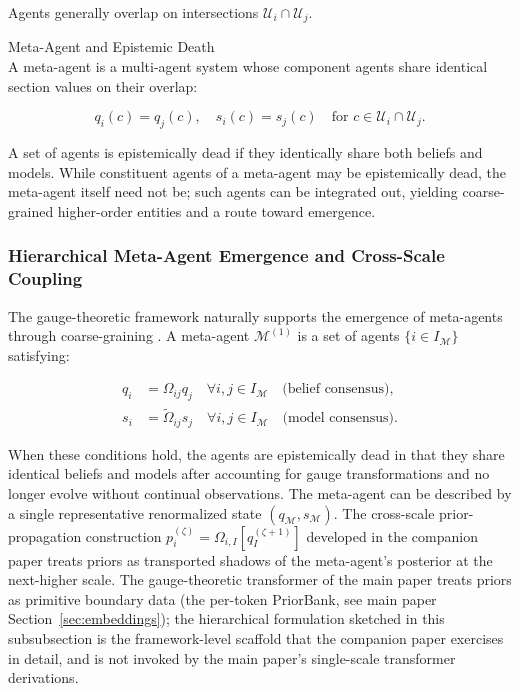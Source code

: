 \documentclass[twoside,11pt]{article}
\begin{document}
Agents generally overlap on intersections $\mathcal{U}_i \cap \mathcal{U}_j$.

Meta-Agent and Epistemic Death\\
A meta-agent is a multi-agent system whose component agents share identical section values on their overlap:

\begin{equation}
q_i(c) = q_j(c), \quad s_i(c) = s_j(c) \quad \text{for } c \in \mathcal{U}_i \cap \mathcal{U}_j.
\end{equation}

A set of agents is epistemically dead if they identically share both beliefs and models. While constituent agents of a meta-agent may be epistemically dead, the meta-agent itself need not be; such agents can be integrated out, yielding coarse-grained higher-order entities and a route toward emergence.

\subsubsection{Hierarchical Meta-Agent Emergence and Cross-Scale Coupling}
\label{sec:appendix_meta_agent}

The gauge-theoretic framework naturally supports the emergence of meta-agents through coarse-graining \citep{kadanoff1966scaling,wilson1974renormalization}. A meta-agent $\mathcal{M}^{(1)}$ is a set of agents $\{i \in I_{\mathcal{M}}\}$ satisfying:

\begin{align}
q_i &= \Omega_{ij} q_j \quad \forall i,j \in I_{\mathcal{M}} \quad \text{(belief consensus)}, \label{eq:belief_consensus} \\
s_i &= \tilde{\Omega}_{ij} s_j \quad \forall i,j \in I_{\mathcal{M}} \quad \text{(model consensus)}. \label{eq:model_consensus}
\end{align}

When these conditions hold, the agents are epistemically dead in that they share identical beliefs and models after accounting for gauge transformations and no longer evolve without continual observations. The meta-agent can be described by a single representative renormalized state $(q_{\mathcal{M}}, s_{\mathcal{M}})$. The cross-scale prior-propagation construction $p_i^{(\zeta)} = \Omega_{i,I}[q_I^{(\zeta+1)}]$ developed in the companion paper \citep{Dennis2025it} treats priors as transported shadows of the meta-agent's posterior at the next-higher scale. The gauge-theoretic transformer of the main paper treats priors as primitive boundary data (the per-token PriorBank, see main paper Section~\ref{sec:embeddings}); the hierarchical formulation sketched in this subsubsection is the framework-level scaffold that the companion paper exercises in detail, and is not invoked by the main paper's single-scale transformer derivations.
\end{document}
